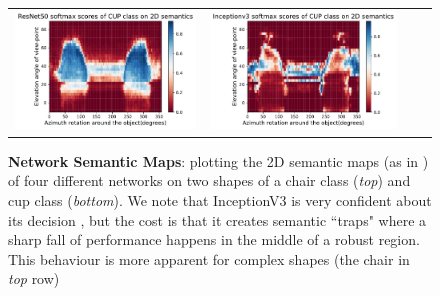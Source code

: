 \begin{figure}[t]
\begin{tabular}{c|c|c|c}
  \includegraphics[trim={3cm 1.4cm 2.8cm 1.2cm},clip, width=.25\linewidth]{images/pipeline/ResNet50_cup_4.pdf} &
  \includegraphics[trim={3.2cm 1.4cm 2.8cm 1.2cm},clip, width=.259\linewidth]{images/pipeline/Inceptionv3_cup_4.pdf} \\
   \end{tabular}
\vspace{-9pt}
\caption{ \small \textbf{Network Semantic Maps}: plotting the 2D semantic maps (as in ) of four different networks on two shapes of a chair class (\textit{top}) and cup class (\textit{bottom}).%
 We note that InceptionV3 is very confident about its decision , but the cost is that it creates semantic ``traps" where a sharp fall of performance happens in the middle of a robust region. This behaviour is more apparent for complex shapes (\eg the chair in \textit{top} row)}
\label{fig:NMS}
\vspace{-9pt}
\end{figure}
